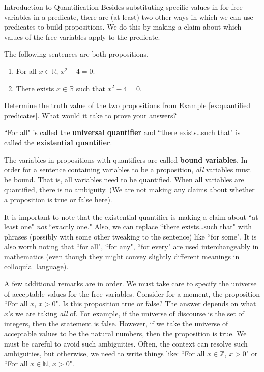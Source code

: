 \begin{section}{Introduction to Quantification}
Besides substituting specific values in for free variables in a predicate, there are (at least) two other ways in which we can use predicates to build propositions.  We do this by making a claim about which values of the free variables apply to the predicate.

\begin{example}\label{ex:quantified predicates}
The following sentences are both propositions.
\begin{enumerate}
\item For all $x\in\mathbb{R}$, $x^2-4=0$.
\item There exists $x\in\mathbb{R}$ such that $x^2-4=0$.
\end{enumerate}
\end{example}

\begin{exercise}
Determine the truth value of the two propositions from Example \ref{ex:quantified predicates}.  What would it take to prove your answers?
\end{exercise}

\begin{definition}
``For all" is called the \textbf{universal quantifier} and ``there exists\ldots such that" is called the \textbf{existential quantifier}.
\end{definition}

The variables in propositions with quantifiers are called \textbf{bound variables}.  In order for a sentence containing variables to be a proposition, \emph{all} variables must be bound.  That is, all variables need to be quantified.  When all variables are quantified, there is no ambiguity.  (We are not making any claims about whether a proposition is true or false here).

It is important to note that the existential quantifier is making a claim about ``at least one" \emph{not} ``exactly one."    Also, we can replace ``there exists\ldots such that" with phrases (possibly with some other tweaking to the sentence) like ``for some".  It is also worth noting that ``for all", ``for any", ``for every" are used interchangeably in mathematics (even though they might convey slightly different meanings in colloquial language).  

A few additional remarks are in order.  We must take care to specify the universe of acceptable values for the free variables.  Consider for a moment, the proposition ``For all $x$, $x>0$".  Is this proposition true or false?  The answer depends on what $x$'s we are taking \emph{all} of.  For example, if the universe of discourse is the set of integers, then the statement is false.  However, if we take the universe of acceptable values to be the natural numbers, then the proposition is true.  We must be careful to avoid such ambiguities.  Often, the context can resolve such ambiguities, but otherwise, we need to write things like: ``For all $x\in\mathbb{Z}$, $x>0$" or ``For all $x\in\mathbb{N}$, $x>0$".


\end{section}
